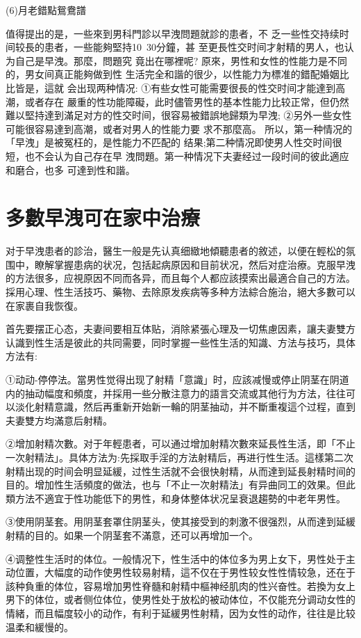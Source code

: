 \documentclass[12pt,UTF8]{ctexbook}
\begin{document}
(6)月老錯點鴛鴦譜

值得提出的是，一些來到男科門診以早洩問題就診的患者，不
乏一些性交持续时间较長的患者，一些能夠堅持10~30分鐘，甚
至更長性交时间才射精的男人，也认为自己是早洩。那麼，問題究
竟出在哪裡呢?
原來，男性和女性的性能力是不同的，男女间真正能夠做到性
生活完全和諧的很少，以性能力为標准的錯配婚姻比比皆是，這就
会出现两种情况:
①有些女性可能需要很長的性交时间才能達到高潮，或者存在
嚴重的性功能障礙，此时儘管男性的基本性能力比较正常，但仍然
難以堅持達到滿足对方的性交时间，很容易被錯誤地歸類为早洩;
②另外一些女性可能很容易達到高潮，或者对男人的性能力要
求不那麼高。
所以，第一种情况的「早洩」是被冤枉的，是性能力不匹配的
结果;第二种情况即使男人性交时间很短，也不会认为自己存在早
洩問題。第一种情况下夫妻经过一段时间的彼此適应和磨合，也多
可達到性和諧。

\section{多數早洩可在家中治療}

对于早洩患者的診治，醫生一般是先认真细緻地傾聽患者的敘述，以便在輕松的氛围中，瞭解掌握患病的状况，包括起病原因和目前状况，然后对症治療。克服早洩的方法很多，应視原因不同而各异，而且每个人都应該摸索出最適合自己的方法。採用心理、性生活技巧、藥物、去除原发疾病等多种方法綜合施治，絕大多數可以在家裹自我恢復。

首先要摆正心态，夫妻间要相互体贴，消除紧張心理及一切焦慮因素，讓夫妻雙方认識到性生活是彼此的共同需要，同时掌握一些性生活的知識、方法与技巧，具体方法有:

①动动-停停法。當男性觉得出现了射精「意識」时，应該减慢或停止阴茎在阴道内的抽动幅度和頻度，并採用一些分散注意力的語言交流或其他行为方法，往往可以淡化射精意識，然后再重新开始新一輪的阴茎抽动，并不斷重複這个过程，直到夫妻雙方均滿意后射精。

②增加射精次數。对于年輕患者，可以通过增加射精次數來延長性生活，即「不止一次射精法」。具体方法为:先採取手淫的方法射精后，再进行性生活。這樣第二次射精出现的时间会明显延緩，过性生活就不会很快射精，从而達到延長射精时间的目的。增加性生活頻度的做法，也与「不止一次射精法」有异曲同工的效果。但此類方法不適宜于性功能低下的男性，和身体整体状况呈衰退趨勢的中老年男性。

③使用阴茎套。用阴茎套罩住阴茎头，使其接受到的刺激不很强烈，从而達到延緩射精的目的。如果一个阴茎套不滿意，还可以再增加一个。

④调整性生活时的体位。一般情况下，性生活中的体位多为男上女下，男性处于主动位置，大幅度的动作使男性较易射精，這不仅在于男性较女性性情较急，还在于該种負重的体位，容易增加男性脊髓和射精中樞神经肌肉的性兴奋性。若換为女上男下的体位，或者侧位体位，使男性处于放松的被动体位，不仅能充分调动女性的情緒，而且幅度较小的动作，有利于延緩男性射精，因为女性的动作，往往是比较温柔和緩慢的。
\end{document}
